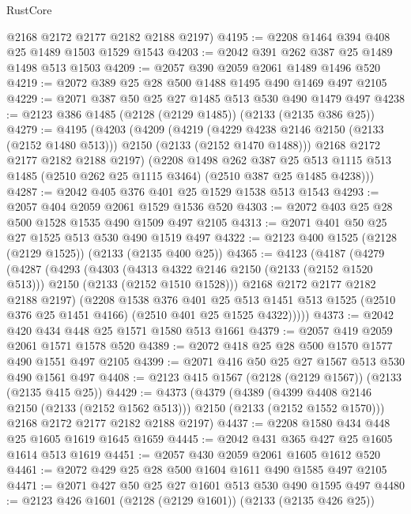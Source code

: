 \begin{lexlean}{RustCore}
\begin{coremodule}
      @2168
      @2172
      @2177
      @2182
      @2188
      @2197)
@4195 := @2208 @1464 @394 @408 @25 @1489 @1503 @1529 @1543
@4203 := @2042 @391 @262 @387 @25 @1489 @1498 @513 @1503
@4209 := @2057 @390 @2059 @2061 @1489 @1496 @520
@4219 := @2072 @389 @25 @28 @500 @1488 @1495 @490 @1469 @497 @2105
@4229 := @2071 @387 @50 @25 @27 @1485 @513 @530 @490 @1479 @497
@4238 := @2123 @386 @1485 (@2128 (@2129 @1485)) (@2133 (@2135 @386 @25))
@4279 := @4195
    (@4203
      (@4209
        (@4219
          (@4229 @4238 @2146 @2150 (@2133 (@2152 @1480 @513)))
          @2150
          (@2133 (@2152 @1470 @1488)))
        @2168
        @2172
        @2177
        @2182
        @2188
        @2197)
      (@2208
        @1498
        @262
        @387
        @25
        @513
        @1115
        @513
        @1485
        (@2510 @262 @25 @1115 @3464)
        (@2510 @387 @25 @1485 @4238)))
@4287 := @2042 @405 @376 @401 @25 @1529 @1538 @513 @1543
@4293 := @2057 @404 @2059 @2061 @1529 @1536 @520
@4303 := @2072 @403 @25 @28 @500 @1528 @1535 @490 @1509 @497 @2105
@4313 := @2071 @401 @50 @25 @27 @1525 @513 @530 @490 @1519 @497
@4322 := @2123 @400 @1525 (@2128 (@2129 @1525)) (@2133 (@2135 @400 @25))
@4365 := @4123
    (@4187
      (@4279
        (@4287
          (@4293
            (@4303
              (@4313 @4322 @2146 @2150 (@2133 (@2152 @1520 @513)))
              @2150
              (@2133 (@2152 @1510 @1528)))
            @2168
            @2172
            @2177
            @2182
            @2188
            @2197)
          (@2208
            @1538
            @376
            @401
            @25
            @513
            @1451
            @513
            @1525
            (@2510 @376 @25 @1451 @4166)
            (@2510 @401 @25 @1525 @4322)))))
@4373 := @2042 @420 @434 @448 @25 @1571 @1580 @513 @1661
@4379 := @2057 @419 @2059 @2061 @1571 @1578 @520
@4389 := @2072 @418 @25 @28 @500 @1570 @1577 @490 @1551 @497 @2105
@4399 := @2071 @416 @50 @25 @27 @1567 @513 @530 @490 @1561 @497
@4408 := @2123 @415 @1567 (@2128 (@2129 @1567)) (@2133 (@2135 @415 @25))
@4429 := @4373
    (@4379
      (@4389 (@4399 @4408 @2146 @2150 (@2133 (@2152 @1562 @513))) @2150 (@2133 (@2152 @1552 @1570)))
      @2168
      @2172
      @2177
      @2182
      @2188
      @2197)
@4437 := @2208 @1580 @434 @448 @25 @1605 @1619 @1645 @1659
@4445 := @2042 @431 @365 @427 @25 @1605 @1614 @513 @1619
@4451 := @2057 @430 @2059 @2061 @1605 @1612 @520
@4461 := @2072 @429 @25 @28 @500 @1604 @1611 @490 @1585 @497 @2105
@4471 := @2071 @427 @50 @25 @27 @1601 @513 @530 @490 @1595 @497
@4480 := @2123 @426 @1601 (@2128 (@2129 @1601)) (@2133 (@2135 @426 @25))

\end{coremodule}
\end{lexlean}
